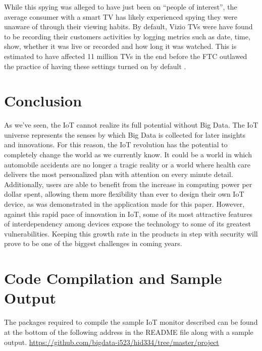 \documentclass[sigconf]{acmart}
\begin{document}
While this spying was alleged to have just been on ``people of interest'', the average consumer with a smart TV has likely experienced spying they were unaware of through their viewing habits. By default, Vizio TVs were have found to be recording their customers activities by logging metrics such as date, time, show, whether it was live or recorded and how long it was watched. This is estimated to have affected 11 million TVs in the end before the FTC outlawed the practice of having these settings turned on by default \cite{smarttvsettle}. 

\section{Conclusion}
As we've seen, the IoT cannot realize its full potential without Big Data. The IoT universe represents the senses by which Big Data is collected for later insights and innovations. For this reason, the IoT revolution has the potential to completely change the world as we currently know. It could be a world in which automobile accidents are no longer a tragic reality or a world where health care delivers the most personalized plan with attention on every minute detail. Additionally, users are able to benefit from the increase in computing power per dollar spent, allowing them more flexibility than ever to design their own IoT device, as was demonstrated in the application made for this paper. However, against this rapid pace of innovation in IoT, some of its most attractive features of interdependency among devices expose the technology to some of its greatest vulnerabilities. Keeping this growth rate in the products in step with security will prove to be one of the biggest challenges in coming years. 

\appendix

\section{Code Compilation and Sample Output}
The packages required to compile the sample IoT monitor described can be found at the bottom of the following address in the README file along with a sample output. 
\url{https://github.com/bigdata-i523/hid334/tree/master/project}

\end{document}
